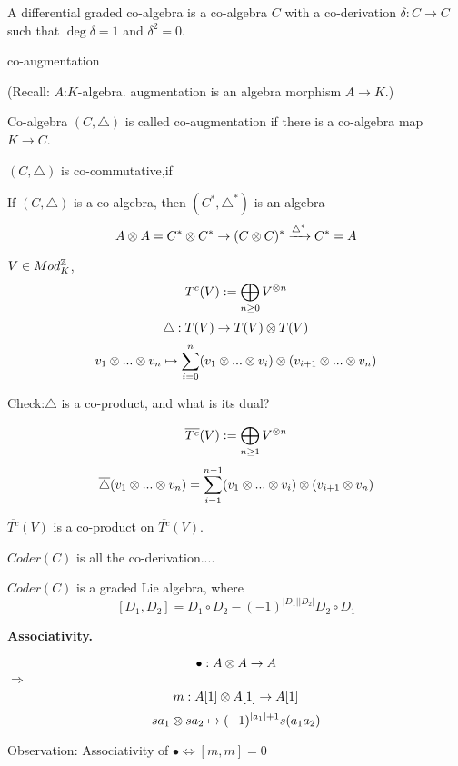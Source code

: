 A differential graded co-algebra is a co-algebra
$C$ with a co-derivation $\delta:C\to C$ such that
$\deg\delta=1$ and $\delta^2=0$.

co-augmentation

 (Recall:
 $A$:$K$-algebra. augmentation is an algebra morphism
$A\to K$.)

Co-algebra $(C,\triangle)$ is called co-augmentation if
there is a co-algebra map $K\to C$.

$(C,\triangle)$ is co-commutative,if

\begin{rem}
If $(C,\triangle)$ is a co-algebra, then
$(C^*,\triangle^*)$ is an algebra
$$A\otimes A=C^*\otimes C^*\to(C\otimes C)^*\xrightarrow{\triangle^*}C^*=A$$
\end{rem}

\begin{example}
$V\in Mod_K^{\mathbb{Z}}$,
$$T^c(V):=\bigoplus_{n\geq 0}V^{\otimes n}$$
$$\triangle:T(V)\to T(V)\otimes T(V)$$
$$v_1\otimes...\otimes v_n\mapsto
\sum_{i=0}^n(v_1\otimes...\otimes v_i)\otimes(v_{i+1}\otimes...\otimes v_n)$$
\end{example}

Check:$\triangle$ is a co-product, and what is its dual?

\begin{example}
$$\overline{T^c}(V):=\bigoplus_{n\geq 1}V^{\otimes n}$$
$$\overline{\triangle}(v_1\otimes...\otimes v_n)
=
\sum_{i=1}^{n-1}(v_1\otimes...\otimes v_i)\otimes(v_{i+1}\otimes v_n)$$

$\overline{T^c}(V)$ is a co-product on $\overline{T^c}(V)$.
\end{example}

$Coder(C)$ is all the co-derivation....

\begin{prop}
$Coder(C)$ is a graded Lie algebra, where
$$[D_1,D_2]=D_1\circ D_2-(-1)^{|D_1||D_2|}D_2\circ D_1$$
\end{prop}

\textbf{Associativity.}

$$\bullet:A\otimes A\to A$$
$\Longrightarrow$
$$m:A[1]\otimes A[1]\to A[1]$$
$$sa_1\otimes sa_2\mapsto(-1)^{|a_1|+1}s(a_1a_2)$$

Observation:
Associativity of $\bullet\Longleftrightarrow[m,m]=0$








